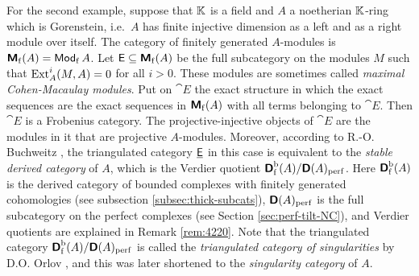 \begin{rem}
For the second example, suppose that $\mathbb{K}$ is a field and $A$ a noetherian 
$\mathbb{K}$-ring which is Gorenstein, i.e.\ $A$ has finite injective dimension 
as a left and as a right module over itself. The category of finitely generated 
$A$-modules is $\boldsymbol{\mathsf{M}}_{\mathrm{f}}(A) = \operatorname{\mathsf{Mod}}_{\mathrm{f}} A$.
Let $\operatorname{\mathsf{E}} \subseteq \boldsymbol{\mathsf{M}}_{\mathrm{f}}(A)$ 
be the full subcategory on the modules $M$ such that 
$\operatorname{Ext}^i_A(M, A) = 0$ for all $i > 0$. These modules are sometimes called 
{\em maximal Cohen-Macaulay modules}. Put on $\cat{E}$ the exact structure in 
which the exact sequences are the exact sequences in $\boldsymbol{\mathsf{M}}_{\mathrm{f}}(A)$
with all terms belonging to $\cat{E}$. Then $\cat{E}$ is a Frobenius category. 
The projective-injective objects of $\cat{E}$ are the modules in it that are
projective $A$-modules. Moreover, according to R.-O. Buchweitz \cite{Buch},
the triangulated category $\underline{\operatorname{\mathsf{E}}}$ in this case is equivalent to the {\em 
stable derived category} of $A$, which is the Verdier quotient 
$\boldsymbol{\mathsf{D}}^{\mathrm{b}}_{\mathrm{f}}(A) / \boldsymbol{\mathsf{D}}(A)_{\mathrm{perf}}$.
Here $\boldsymbol{\mathsf{D}}^{\mathrm{b}}_{\mathrm{f}}(A)$ is the derived category of bounded 
complexes with finitely generated cohomologies (see subsection 
\ref{subsec:thick-subcats}), $\boldsymbol{\mathsf{D}}(A)_{\mathrm{perf}}$ is the full 
subcategory on the perfect complexes (see Section \ref{sec:perf-tilt-NC}), and 
Verdier quotients are explained in Remark \ref{rem:4220}. 
Note that the triangulated category 
$\boldsymbol{\mathsf{D}}^{\mathrm{b}}_{\mathrm{f}}(A) / \boldsymbol{\mathsf{D}}(A)_{\mathrm{perf}}$
is called the {\em triangulated category of singularities}  by
D.O. Orlov \cite{Orl}, and this was later shortened to the {\em singularity 
category} of $A$.
\end{rem}

